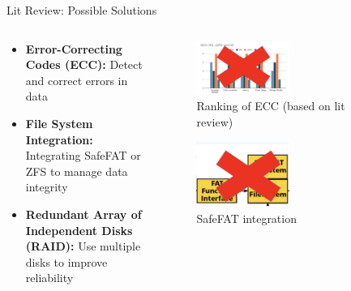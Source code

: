 \begin{frame}{Lit Review: Possible Solutions}
    \begin{columns}
        \begin{column}{0.5\textwidth}
            \begin{itemize}
                \item \textbf{Error-Correcting Codes (ECC):} Detect and correct errors in data
                \item \textbf{File System Integration:} Integrating SafeFAT or ZFS to manage data integrity
                \item \textbf{Redundant Array of Independent Disks (RAID):} Use multiple disks to improve reliability
            \end{itemize}
        \end{column}
        \begin{column}{0.5\textwidth}
            \begin{figure}
                \centering
                \includegraphics[height=0.4\textheight,width=0.5\textwidth,keepaspectratio]{images/ecc_x.png}
                \caption{Ranking of ECC (based on lit review)}
            \end{figure}
            \begin{figure}
                \centering
                \includegraphics[height=0.4\textheight,width=0.5\textwidth,keepaspectratio]{images/safefat_x.png}
                \caption{SafeFAT integration}
            \end{figure}
        \end{column}
    \end{columns}  
\end{frame}

